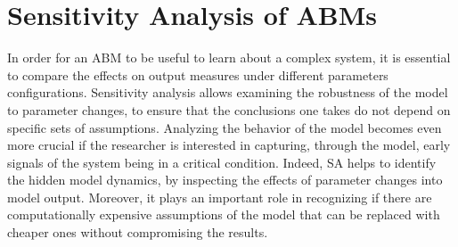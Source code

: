 
\section{Sensitivity Analysis of ABMs} \label{sa-abm}



In order for an ABM to be useful to learn about a complex system, it is essential to compare the effects on output measures under different parameters configurations. Sensitivity analysis allows examining the robustness of the model to parameter changes, to ensure that the conclusions one takes do not depend on specific sets of assumptions. Analyzing the behavior of the model becomes even more crucial if the researcher is interested in capturing, through the model, early signals of the system being in a critical condition. Indeed, SA helps to identify the hidden model dynamics, by inspecting the effects of parameter changes into model output. Moreover, it plays an important role in recognizing if there are computationally expensive assumptions of the model that can be replaced with cheaper ones without compromising the results.  

